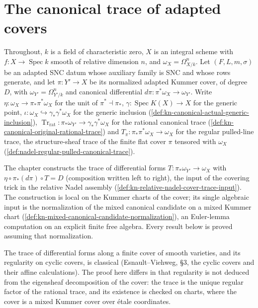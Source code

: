 \section{The canonical trace of adapted covers}
\label{sec:kn-nadel-canonical-trace-chain}

Throughout, $k$ is a field of characteristic zero, $X$ is an integral scheme
with $f:X\to\operatorname{Spec}k$ smooth of relative dimension $n$, and
$\omega_X=\Omega^n_{X/k}$. Let $(F,L,m,\sigma)$ be an adapted SNC datum whose
auxiliary family is SNC and whose rows generate, and let
$\pi:Y'\to X$ be its normalized adapted Kummer cover, of degree $D$, with
$\omega_{Y'}=\Omega^n_{Y'/k}$ and canonical differential
$d\pi:\pi^*\omega_X\to\omega_{Y'}$. Write $\eta:\omega_X\to\pi_*\pi^*\omega_X$
for the unit of $\pi^*\dashv\pi_*$, $\gamma:\operatorname{Spec}K(X)\to X$ for
the generic point, $\iota:\omega_X\hookrightarrow\gamma_*\gamma^*\omega_X$ for
the generic inclusion (\cref{def:kn-canonical-actual-generic-inclusion}),
$\operatorname{Tr}_{\mathrm{rat}}:\pi_*\omega_{Y'}\to\gamma_*\gamma^*\omega_X$
for the rational canonical trace
(\cref{def:kn-canonical-original-rational-trace}) and
$T_\pi:\pi_*\pi^*\omega_X\to\omega_X$ for the regular pulled-line trace, the
structure-sheaf trace of the finite flat cover $\pi$ tensored with $\omega_X$
(\cref{def:nadel-regular-pulled-canonical-trace}).

The chapter constructs the trace of differential forms
$T:\pi_*\omega_{Y'}\to\omega_X$ with $\eta\circ\pi_*(d\pi)\circ T=D$ (composition
written left to right), the input of the covering trick in the relative Nadel
assembly (\cref{def:kn-relative-nadel-cover-trace-input}). The construction is
local on the Kummer charts of the cover; its single algebraic input is the
normalization of the mixed canonical candidate on a mixed Kummer chart
(\cref{def:kn-mixed-canonical-candidate-normalization}), an Euler-lemma
computation on an explicit finite free algebra. Every result below is proved
assuming that normalization.

The trace of differential forms along a finite cover of smooth varieties, and
its regularity on cyclic covers, is classical (Esnault--Viehweg, \S3, the
cyclic covers and their affine calculations). The proof here differs in that
regularity is not deduced from the eigensheaf decomposition of the cover: the
trace is the unique regular factor of the rational trace, and its existence is
checked on charts, where the cover is a mixed Kummer cover over \'etale
coordinates.

